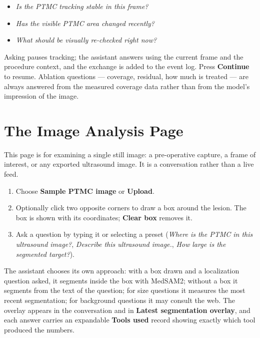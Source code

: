 \documentclass[11pt,a4paper]{article}
\newcommand{\ui}[1]{\textbf{#1}}
\begin{document}
\begin{itemize}[leftmargin=1.4em]
  \item \emph{Is the PTMC tracking stable in this frame?}
  \item \emph{Has the visible PTMC area changed recently?}
  \item \emph{What should be visually re-checked right now?}
\end{itemize}

Asking pauses tracking; the assistant answers using the current frame and the
procedure context, and the exchange is added to the event log. Press
\ui{Continue} to resume. Ablation questions --- coverage, residual, how much
is treated --- are always answered from the measured coverage data rather than
from the model's impression of the image.

\section{The Image Analysis Page}

This page is for examining a single still image: a pre-operative capture, a
frame of interest, or any exported ultrasound image. It is a conversation
rather than a live feed.

\begin{enumerate}[leftmargin=1.6em]
  \item Choose \ui{Sample PTMC image} or \ui{Upload}.
  \item Optionally click two opposite corners to draw a box around the lesion.
  The box is shown with its coordinates; \ui{Clear box} removes it.
  \item Ask a question by typing it or selecting a preset (\emph{Where is the
  PTMC in this ultrasound image?}, \emph{Describe this ultrasound image.},
  \emph{How large is the segmented target?}).
\end{enumerate}

The assistant chooses its own approach: with a box drawn and a localization
question asked, it segments inside the box with MedSAM2; without a box it
segments from the text of the question; for size questions it measures the
most recent segmentation; for background questions it may consult the web.
The overlay appears in the conversation and in \ui{Latest segmentation
overlay}, and each answer carries an expandable \ui{Tools used} record showing
exactly which tool produced the numbers.
\end{document}
